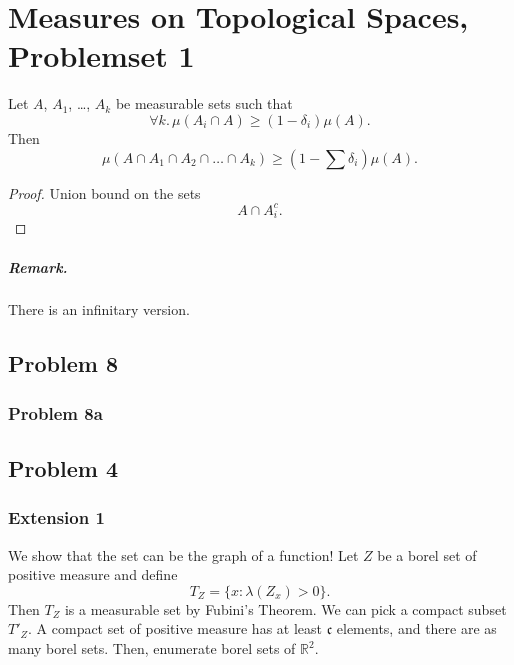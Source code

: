 \chapter{Measures on Topological Spaces, Problemset 1}

\begin{lemma}\label{CuttingOutMeasure}
    Let \(A\), \(A_1\), \ldots, \(A_k\) be measurable sets such that
    \[
        \forall k.\, \mu(A_i \cap A) \geq (1 - \delta_i)\mu(A).
    \]
    Then
    \[
        \mu(A \cap A_1 \cap A_2 \cap \ldots \cap A_k) \geq \left(1 - \sum \delta_i \right) \mu(A).
    \]
\end{lemma}
\begin{proof}
    Union bound on the sets
    \[
        A \cap A_i^c.
    \]
\end{proof}

\paragraph{Remark.} There is an infinitary version.

\section*{Problem 8}
\subsection*{Problem 8a}

\section*{Problem 4}


\subsection*{Extension 1}
We show that the set can be the graph of a function! Let \(Z\) be a borel set of positive measure and define
\[
    T_Z = \{ x : \lambda(Z_x) > 0 \}.
\]
Then \(T_Z\) is a measurable set by Fubini's Theorem. We can pick a compact subset \( T'_Z \). A compact set of positive measure has at least \(\mathfrak{c}\) elements, and there are as many borel sets. Then, enumerate borel sets of \( \mathbb{R}^2 \).

